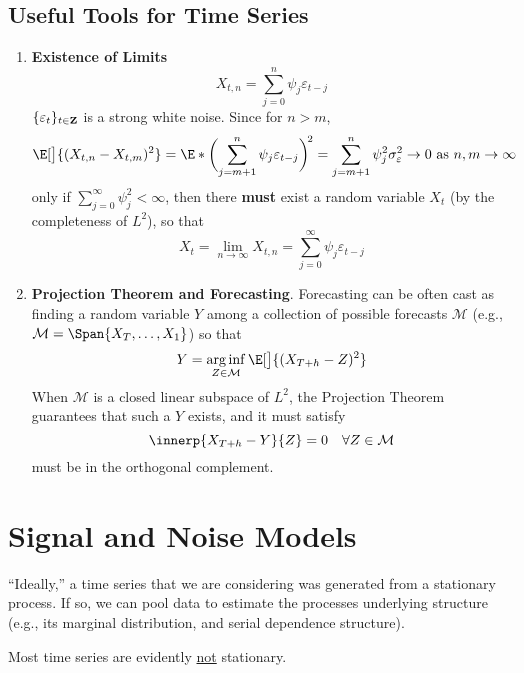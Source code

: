 \subsection*{Useful Tools for Time Series}
\begin{enumerate}[(1)]
    \item \textbf{Existence of Limits}
          \[ X_{t,n}=\sum_{j=0}^{n} \psi_j \varepsilon_{t-j}
          \]
          $ \{\varepsilon_t\}_{t\in\mathbf{Z}} $ is a strong white noise.
          Since for $ n>m $,
          \[ \E[\big]{(X_{t,n}-X_{t,m})^2}
              =\E*{\biggl(\sum_{j=m+1}^{n} \psi_j \varepsilon_{t-j}\biggr)^{\!2}}
              =\sum_{j=m+1}^{n} \psi_j^2\sigma_{\varepsilon}^2\to 0\text{ as }
              n,m\to \infty \]
          only if $ \sum_{j=0}^{\infty} \psi_j^2<\infty $, then there \textbf{must}
          exist a random variable $ X_t $ (by the completeness of $ L^2 $), so that
          \[ X_t=\lim\limits_{{n} \to {\infty}} X_{t,n}=\sum_{j=0}^{\infty}
              \psi_j \varepsilon_{t-j} \]
    \item \textbf{Projection Theorem and Forecasting}.
          Forecasting can be often cast as finding a random variable $ Y $ among
          a collection of possible forecasts $ \mathcal{M} $ (e.g.,
          $ \mathcal{M}=\Span{X_T,\ldots,X_1} $) so that
          \[ Y=\arginf_{Z\in\mathcal{M}}\E[\big]{(X_{T+h}-Z)^2} \]
          When $ \mathcal{M} $ is a closed linear subspace of $ L^2 $,
          the Projection Theorem guarantees that such a $ Y $ exists,
          and it must satisfy
          \[ \innerp{X_{T+h}-Y}{Z}=0\quad\forall Z\in\mathcal{M} \]
          must be in the orthogonal complement.
\end{enumerate}

\section{Signal and Noise Models}
``Ideally,'' a time series that we are considering
was generated from a stationary process. If so,
we can pool data to estimate the processes underlying structure
(e.g., its marginal distribution, and serial dependence structure).

Most time series are evidently \underline{not} stationary.

